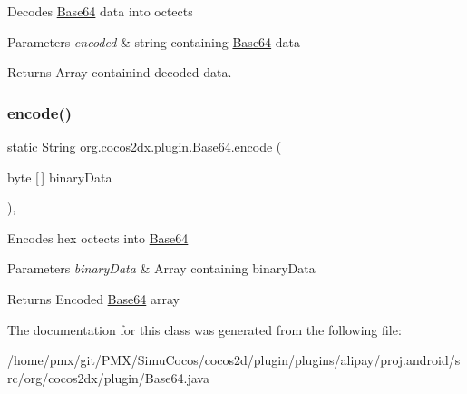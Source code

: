 Decodes \hyperlink{classorg_1_1cocos2dx_1_1plugin_1_1Base64}{Base64} data into octects


\begin{DoxyParams}{Parameters}
{\em encoded} & string containing \hyperlink{classorg_1_1cocos2dx_1_1plugin_1_1Base64}{Base64} data \\
\hline
\end{DoxyParams}
\begin{DoxyReturn}{Returns}
Array containind decoded data. 
\end{DoxyReturn}
\mbox{\label{classorg_1_1cocos2dx_1_1plugin_1_1Base64_a37d7b87107c8210e41b4f31243e8c39a}} 
\subsubsection{\texorpdfstring{encode()}{encode()}}
{\footnotesize\ttfamily static String org.\+cocos2dx.\+plugin.\+Base64.\+encode (\begin{DoxyParamCaption}\item[{byte \mbox{[}$\,$\mbox{]}}]{binary\+Data }\end{DoxyParamCaption})\hspace{0.3cm}{\ttfamily [inline]}, {\ttfamily [static]}}

Encodes hex octects into \hyperlink{classorg_1_1cocos2dx_1_1plugin_1_1Base64}{Base64}


\begin{DoxyParams}{Parameters}
{\em binary\+Data} & Array containing binary\+Data \\
\hline
\end{DoxyParams}
\begin{DoxyReturn}{Returns}
Encoded \hyperlink{classorg_1_1cocos2dx_1_1plugin_1_1Base64}{Base64} array 
\end{DoxyReturn}


The documentation for this class was generated from the following file\+:\begin{DoxyCompactItemize}
\item 
/home/pmx/git/\+P\+M\+X/\+Simu\+Cocos/cocos2d/plugin/plugins/alipay/proj.\+android/src/org/cocos2dx/plugin/Base64.\+java\end{DoxyCompactItemize}
